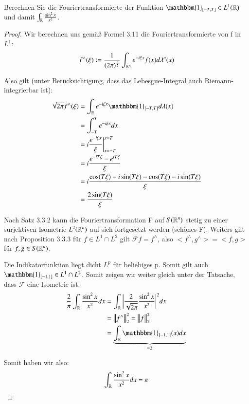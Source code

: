 
\begin{exercise}
	Berechnen Sie die Fouriertransformierte der Funktion $\mathbbm{1}_{[-T, T]} \in L^1(\R)$ und damit $\int_{\mathbb{R}} \frac{\sin^2x}{x^2}$.
\end{exercise}

\begin{proof}
	Wir berechnen uns gemäß Formel 3.11 die Fouriertransformierte von f in $L^1$:
	\begin{equation*}
	f^\wedge(\xi) := \frac{1}{(2\pi)^{\frac{n}{2}}} \int_{\mathbb{R}^n} e^{-i\xi x} f(x) d\lambda^n(x)
	\end{equation*}
	
	Also gilt (unter Berücksichtigung, dass das Lebesgue-Integral auch Riemann-integrierbar ist): 
	\begin{equation*}
	\begin{split}
	\sqrt{2\pi} f^\wedge(\xi) & = \int_{\R} e^{-i\xi x} \mathbbm{1}_{[-T, T]} d\lambda(x)\\
	& = \int_{-T}^{T} e^{-i\xi x} dx \\
	& = i \frac{e^{-i\xi x}}{\xi} \bigg\vert_{x=-T}^{x=T} \\
	& = i \frac{e^{-i T \xi} - e^{i T \xi}}{\xi} \\
	& = i \frac{\cos(T \xi) - i\sin(T \xi) - \cos(T \xi) - i\sin(T \xi)}{\xi} \\
	& = \frac{2 \sin(T\xi)}{\xi}
	\end{split}
	\end{equation*}
	
	Nach Satz 3.3.2 kann die Fouriertransformation F auf $S(\mathbb{R}^n)$ stetig zu einer surjektiven Isometrie $L^2(\mathbb{R}^n)$ auf sich fortgesetzt werden (schönes F). Weiters gilt nach Proposition 3.3.3 für $f \in L^1 \cap L^2$ gilt $\mathcal{F}f = f^\wedge$, also $< f^\wedge, g^\wedge> = <f, g>$ für $f, g \in S(\mathbb{R}^n)$.
	
	Die Indikatorfunktion liegt dicht $L^p$ für beliebiges p. Somit gilt auch $\mathbbm{1}_{[-1, 1]} \in L^1 \cap L^2$. Somit zeigen wir weiter gleich unter der Tatsache, dass $\mathcal{F}$ eine Isometrie ist:
	\begin{equation*}
	\begin{split}
	\frac{2}{\pi} \int_\R \frac{\sin^2x}{x^2}dx & = \int_\R \bigg\vert \frac{2}{\sqrt{2\pi}} \frac{\sin^2x}{x^2} \bigg\vert^2dx \\
	& = \normE{f^\wedge}{2}^2 = \normE{f}{2}^2 \\
	& = \underbrace{\int_{\R} \mathbbm{1}_{[-1, 1]}(x) dx}_{=2}
	\end{split}
	\end{equation*}
	
	Somit haben wir also:
	\begin{equation*}
	\int_{\mathbb{R}} \frac{\sin^2x}{x^2}dx = \pi
	\end{equation*}
\end{proof}
